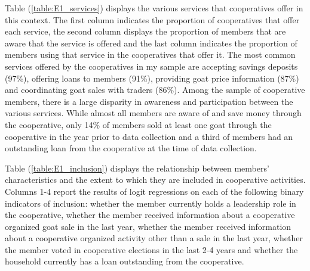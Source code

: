 \documentclass[11pt]{article}
\begin{document}
Table (\ref{table:E1_services}) displays the various services that cooperatives offer in this context. The first column indicates the proportion of cooperatives that offer each service, the second column displays the proportion of members that are aware that the service is offered and the last column indicates the proportion of members using that service in the cooperatives that offer it. The most common services offered by the cooperatives in my sample are accepting savings deposits (97\%), offering loans to members (91\%), providing goat price information (87\%) and coordinating goat sales with traders (86\%). Among the sample of cooperative members, there is a large disparity in awareness and participation between the various services. While almost all members are aware of and save money through the cooperative, only 14\% of members sold at least one goat through the cooperative in the year prior to data collection and a third of members had an outstanding loan from the cooperative at the time of data collection.


Table (\ref{table:E1_inclusion}) displays the relationship between members' characteristics and the extent to which they are included in cooperative activities. Columns 1-4 report the results of logit regressions on each of the following binary indicators of inclusion: whether the member currently holds a leadership role in the cooperative, whether the member received information about a cooperative organized goat sale in the last year, whether the member received information about a cooperative organized activity other than a sale in the last year, whether the member voted in cooperative elections in the last 2-4 years and whether the household currently has a loan outstanding from the cooperative. 
\end{document}
